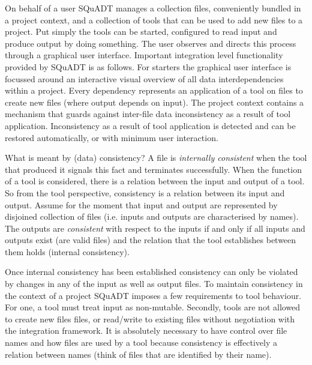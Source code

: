 \documentclass{article}
\newcommand{\squadt}{SQuADT\xspace}
\begin{document}
  On behalf of a user \squadt manages a collection files, conveniently bundled
  in a project context, and a collection of tools that can be used to add new
  files to a project. Put simply the tools can be started, configured to read
  input and produce output by doing something. The user observes and directs
  this process through a graphical user interface. Important integration level
  functionality provided by \squadt is as follows. For starters the graphical
  user interface is focussed around an interactive visual overview of all data
  interdependencies within a project. Every dependency represents an
  application of a tool on files to create new files (where output depends on
  input).  The project context contains a mechanism that guards against
  inter-file data inconsistency as a result of tool application. Inconsistency
  as a result of tool application is detected and can be restored
  automatically, or with minimum user interaction.

  What is meant by (data) consistency?  A file is \textit{internally
  consistent} when the tool that produced it signals this fact and terminates
  successfully. When the function of a tool is considered, there is a relation
  between the input and output of a tool. So from the tool perspective,
  consistency is a relation between its input and output. Assume for the moment
  that input and output are represented by disjoined collection of files (i.e.
  inputs and outputs are characterised by names). The outputs are
  \textit{consistent} with respect to the inputs if and only if all inputs and
  outputs exist (are valid files) and the relation that the tool establishes
  between them holds (internal consistency).

  Once internal consistency has been established consistency can only be
  violated by changes in any of the input as well as output files.  To maintain
  consistency in the context of a project \squadt imposes a few requirements to
  tool behaviour.  For one, a tool must treat input as non-mutable.  Secondly,
  tools are not allowed to create new files files, or read/write to existing
  files without negotiation with the integration framework. It is absolutely
  necessary to have control over file names and how files are used by a tool
  because consistency is effectively a relation between names (think of files
  that are identified by their name).
  
\end{document}
